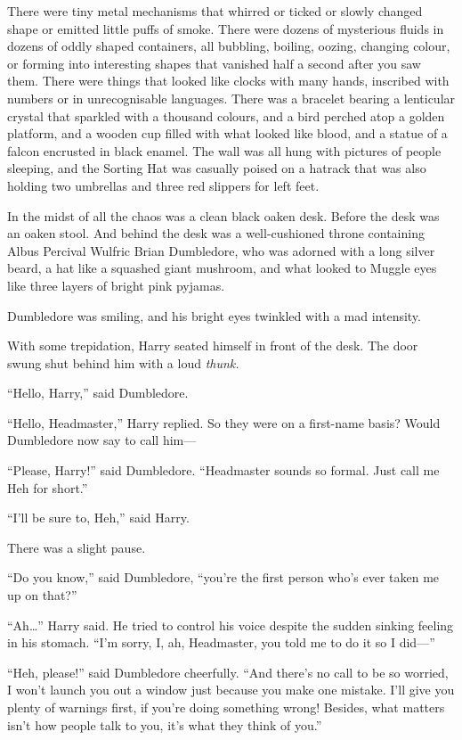 There were tiny metal mechanisms that whirred or ticked or slowly changed shape or emitted little puffs of smoke. There were dozens of mysterious fluids in dozens of oddly shaped containers, all bubbling, boiling, oozing, changing colour, or forming into interesting shapes that vanished half a second after you saw them. There were things that looked like clocks with many hands, inscribed with numbers or in unrecognisable languages. There was a bracelet bearing a lenticular crystal that sparkled with a thousand colours, and a bird perched atop a golden platform, and a wooden cup filled with what looked like blood, and a statue of a falcon encrusted in black enamel. The wall was all hung with pictures of people sleeping, and the Sorting Hat was casually poised on a hatrack that was also holding two umbrellas and three red slippers for left feet.

In the midst of all the chaos was a clean black oaken desk. Before the desk was an oaken stool. And behind the desk was a well-cushioned throne containing Albus Percival Wulfric Brian Dumbledore, who was adorned with a long silver beard, a hat like a squashed giant mushroom, and what looked to Muggle eyes like three layers of bright pink pyjamas.

Dumbledore was smiling, and his bright eyes twinkled with a mad intensity.

With some trepidation, Harry seated himself in front of the desk. The door swung shut behind him with a loud \emph{thunk.}

“Hello, Harry,” said Dumbledore.

“Hello, Headmaster,” Harry replied. So they were on a first-name basis? Would Dumbledore now say to call him—

“Please, Harry!” said Dumbledore. “Headmaster sounds so formal. Just call me Heh for short.”

“I’ll be sure to, Heh,” said Harry.

There was a slight pause.

“Do you know,” said Dumbledore, “you’re the first person who’s ever taken me up on that?”

“Ah…” Harry said. He tried to control his voice despite the sudden sinking feeling in his stomach. “I’m sorry, I, ah, Headmaster, you told me to do it so I did—”

“Heh, please!” said Dumbledore cheerfully. “And there’s no call to be so worried, I won’t launch you out a window just because you make one mistake. I’ll give you plenty of warnings first, if you’re doing something wrong! Besides, what matters isn’t how people talk to you, it’s what they think of you.”

